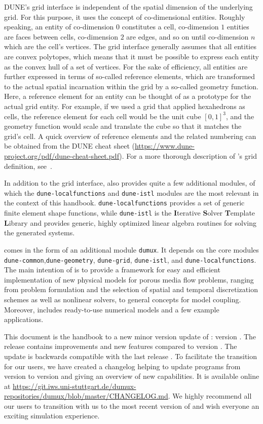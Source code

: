 DUNE's grid interface is independent of the spatial dimension of the
underlying grid. For this purpose, it uses the concept of
co-dimensional entities. Roughly speaking, an entity of co-dimension
$0$ constitutes a cell, co-dimension $1$ entities are faces between
cells, co-dimension $2$ are edges, and so on until co-dimension $n$
which are the cell's vertices.  The \Dune grid interface generally
assumes that all entities are convex polytopes, which means that it
must be possible to express each entity as the convex hull of a set of
vertices. For the sake of efficiency, all entities are further expressed in terms
of so-called reference elements, which are transformed to the actual
spatial incarnation within the grid by a so-called geometry
function. Here, a reference element for an
entity can be thought of as a prototype for the actual grid
entity. For example, if we used a grid that applied hexahedrons as cells,
the reference element for each cell would be the unit cube $[0, 1]^3$,
and the geometry function would scale and translate the cube so that
it matches the grid's cell. A quick overview of reference elements and the
related numbering can be obtained from the DUNE cheat sheet
(\url{https://www.dune-project.org/pdf/dune-cheat-sheet.pdf}).
For a more thorough description of \Dune's
grid definition, see~\cite{BASTIAN2008}.

In addition to the grid interface, \Dune also provides quite a few
additional modules, of which the \texttt{dune-localfunctions} and
\texttt{dune-istl} modules are the most relevant in the context of
this handbook. \texttt{dune-localfunctions} provides a set of generic
finite element shape functions, while \texttt{dune-istl} is the
\textbf{I}terative \textbf{S}olver \textbf{T}emplate \textbf{L}ibrary
and provides generic, highly optimized linear algebra routines for
solving the generated systems.

\Dumux comes in the form of an additional module \texttt{dumux}.
It depends on the \Dune core modules
\texttt{dune-common},\texttt{dune-geometry}, \texttt{dune-grid}, \texttt{dune-istl}, and \texttt{dune-localfunctions}.
The main intention of \Dumux is to provide a framework for easy and efficient
implementation of new physical models for porous media flow problems,
ranging from problem formulation and the selection of
spatial and temporal discretization schemes as well as nonlinear solvers,
to general concepts for model coupling.
Moreover, \Dumux includes ready-to-use numerical models and a few example applications.

This document is the handbook to a new minor version update of \Dumux: version \DumuxVersion.
The release contains improvements and new features compared to version \DumuxOldVersion.
The update is backwards compatible with the last release \DumuxOldVersion.
To facilitate the transition for our users, we have created a changelog
helping to update programs from version \DumuxOldVersion{} to version \DumuxVersion{} and giving an overview of new capabilities.
It is available online at
\url{https://git.iws.uni-stuttgart.de/dumux-repositories/dumux/blob/master/CHANGELOG.md}.
We highly recommend all our users to transition with us to the most recent version of \Dumux
and wish everyone an exciting simulation experience.
